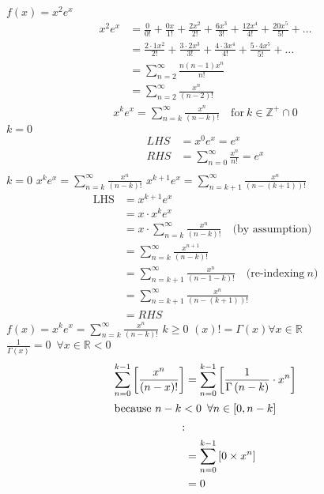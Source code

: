 \documentclass{article}
\begin{document}
$f(x) = x^2e^x$
\begin{align*}
    x^2e^x &= \frac{0}{0!} + \frac{0x}{1!} + \frac{2x^2}{2!} + \frac{6x^3}{3!} + \frac{12x^4}{4!} + \frac{20x^5}{5!} + \dots\\
    &= \frac{2\cdot 1x^2}{2!} + \frac{3\cdot 2 x^3}{3!} + \frac{4\cdot 3x^4}{4!} + \frac{5\cdot 4 x^5}{5!} + \dots\\
    &= \sum_{n=2}^\infty \frac{n(n-1)x^n}{n!}\\
    &= \sum_{n=2}^\infty \frac{x^n}{(n-2)!}
\end{align*}
\begin{align*}
    x^ke^x = \sum_{n=k}^\infty \frac{x^n}{(n-k)!} \quad \text{for}~k\in \mathbb{Z^{+}}\cap0
\end{align*}
$k=0$
\begin{align*}
    LHS &= x^0e^x = e^x\\
    RHS &= \sum_{n=0}^\infty \frac{x^n}{n!} = e^x\\
\end{align*}
$k=0$
$x^k e^x = \sum_{n=k}^\infty\frac{x^n}{(n-k)!}$
$x^{k+1}e^x = \sum_{n=k+1}^\infty\frac{x^n}{(n-(k+1))!}$
\begin{align*}
    \text{LHS} &= x^{k+1}e^x\\
    &= x\cdot x^{k}e^x\\
    &= x\cdot \sum_{n=k}^\infty\frac{x^n}{(n-k)!} \quad \text{(by assumption)}\\
    &= \sum_{n=k}^\infty\frac{x^{n+1}}{(n-k)!}\\
    &= \sum_{n=k+1}^\infty\frac{x^n}{(n-1-k)!} \quad \text{(re-indexing}~ n\text{)}\\
    &= \sum_{n=k+1}^\infty\frac{x^n}{(n-(k+1))!}\\
    &= RHS
\end{align*}
$f(x) = x^ke^x = \sum_{n=k}^\infty\frac{x^n}{(n-k)!}$
$k \ge 0$
$\left( x \right)! = \Gamma\left( x \right) \forall x \in \mathbb{R}$
$\frac{1}{\Gamma\left( x \right)} = 0 \enspace \forall x \in \mathbb{R} < 0$
\begin{align}
    \sum^{k- 1}_{n= 0}   \left[ \frac{x^n}{\left( n- x \right)!} \right] &= \sum^{k- 1}_{n= 0}   \left[ \frac{1}{\Gamma\left( n- k \right)} \cdot  x^{n} \right]  \\
    \intertext{because \(n- k < 0 \enspace \forall n \in \left[ 0, n- k \right] \)}: \notag \\
    &= \sum^{k- 1}_{n= 0}   \left[ 0\times x^n \right]  \\
    &= 0
\end{align}
\end{document}
